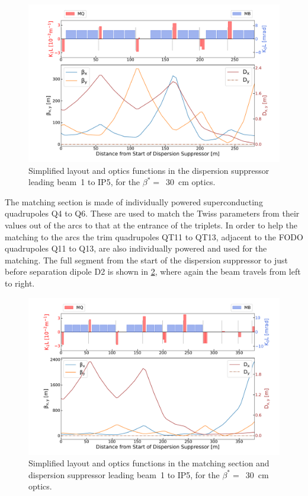 \begin{figure}[!hbt]
  \centering
  \includegraphics*[width=0.99\linewidth]{Figures/Optics_Measurements_Corrections_at_LHC/lhc_dispersion_suppressor.pdf}
  \caption{Simplified layout and optics functions in the dispersion suppressor leading beam~\num{1} to IP\num{5}, for the \(\beta^{\ast} =\)~\qty{30}{\centi\meter} optics.}
  \label{figure:lhc_dispersion_suppressor}
\end{figure}

The matching section is made of individually powered superconducting quadrupoles Q\num{4} to Q\num{6}.
These are used to match the Twiss parameters from their values out of the arcs to that at the entrance of the triplets.
In order to help the matching to the arcs the trim quadrupoles QT\num{11} to QT\num{13}, adjacent to the FODO quadrupoles Q\num{11} to Q\num{13}, are also individually powered and used for the matching.
The full segment from the start of the dispersion suppressor to just before separation dipole D\num{2} is shown in \cref{figure:lhc_matching_section}, where again the beam travels from left to right.

\begin{figure}[!hbt]
  \centering
  \includegraphics*[width=0.99\linewidth]{Figures/Optics_Measurements_Corrections_at_LHC/lhc_matching_section.pdf}
  \caption{Simplified layout and optics functions in the matching section and dispersion suppressor leading beam~\num{1} to IP\num{5}, for the \(\beta^{\ast} =\)~\qty{30}{\centi\meter} optics.}
  \label{figure:lhc_matching_section}
\end{figure}

